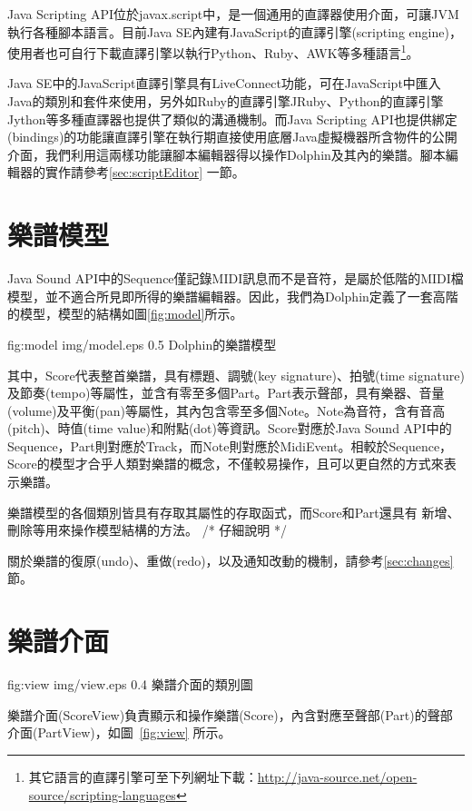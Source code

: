 \documentclass[12pt,a4paper,oneside]{report}
\begin{document}
Java Scripting API位於javax.script中，是一個通用的直譯器使用介面，可讓JVM 執行各種腳本語言。目前Java SE內建有JavaScript的直譯引擎(scripting engine)，使用者也可自行下載直譯引擎以執行Python、Ruby、AWK等多種語言\footnote{其它語言的直譯引擎可至下列網址下載：\url{http://java-source.net/open-source/scripting-languages}}。

Java SE中的JavaScript直譯引擎具有LiveConnect功能，可在JavaScript中匯入Java的類別和套件來使用，另外如Ruby的直譯引擎JRuby、Python的直譯引擎Jython等多種直譯器也提供了類似的溝通機制。而Java Scripting API也提供綁定(bindings)的功能讓直譯引擎在執行期直接使用底層Java虛擬機器所含物件的公開介面，我們利用這兩樣功能讓腳本編輯器得以操作Dolphin及其內的樂譜。腳本編輯器的實作請參考\ref{sec:scriptEditor} 一節。

\section{樂譜模型}

Java Sound API中的Sequence僅記錄MIDI訊息而不是音符，是屬於低階的MIDI檔模型，並不適合所見即所得的樂譜編輯器。因此，我們為Dolphin定義了一套高階的模型，模型的結構如圖\ref{fig:model}所示。

\figurewithcaption
{fig:model}
{img/model.eps}
{0.5}
{Dolphin的樂譜模型}

其中，Score代表整首樂譜，具有標題、調號(key signature)、拍號(time signature)及節奏(tempo)等屬性，並含有零至多個Part。Part表示聲部，具有樂器、音量(volume)及平衡(pan)等屬性，其內包含零至多個Note。Note為音符，含有音高(pitch)、時值(time value)和附點(dot)等資訊。Score對應於Java Sound API中的Sequence，Part則對應於Track，而Note則對應於MidiEvent。相較於Sequence，Score的模型才合乎人類對樂譜的概念，不僅較易操作，且可以更自然的方式來表示樂譜。

樂譜模型的各個類別皆具有存取其屬性的存取函式，而Score和Part還具有
新增、刪除等用來操作模型結構的方法。 /*  
仔細說明  
*/

關於樂譜的復原(undo)、重做(redo)，以及通知改動的機制，請參考\ref{sec:changes} 節。


\section{樂譜介面} %


\figurewithcaption
{fig:view}
{img/view.eps}
{0.4}
{樂譜介面的類別圖}

樂譜介面(ScoreView)負責顯示和操作樂譜(Score)，內含對應至聲部(Part)的聲部介面(PartView)，如圖~\ref{fig:view} 所示。
\end{document}
